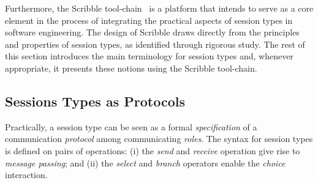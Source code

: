 
Furthermore, the Scribble tool-chain~\cite{scribble} is a platform
that intends to serve as a core element in the process
of integrating the practical aspects of session types
in software engineering. The design of Scribble
draws directly from the principles and properties of session types,
as identified through rigorous study. The rest of this
section introduces the main terminology for session types
and, whenever appropriate, it presents these notions
using the Scribble tool-chain.



\subsection{Sessions Types as Protocols}%
\label{sec:sessions_scribble}


Practically, a session type can be seen as a formal
{\em specification} of a communication {\em protocol} among communicating {\em roles}.
The syntax for session types is defined on pairs of operations:
(i) the {\em send} and {\em receive} operation give rise to
{\em message passing}; and
(ii) the {\em select} and {\em branch} operators enable the
{\em choice} interaction.

